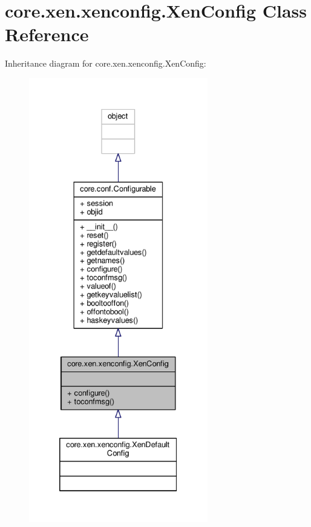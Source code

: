 \hypertarget{classcore_1_1xen_1_1xenconfig_1_1_xen_config}{\section{core.\+xen.\+xenconfig.\+Xen\+Config Class Reference}
\label{classcore_1_1xen_1_1xenconfig_1_1_xen_config}
}


Inheritance diagram for core.\+xen.\+xenconfig.\+Xen\+Config\+:
\nopagebreak
\begin{figure}[H]
\begin{center}
\leavevmode
\includegraphics[height=550pt]{classcore_1_1xen_1_1xenconfig_1_1_xen_config__inherit__graph}
\end{center}
\end{figure}


